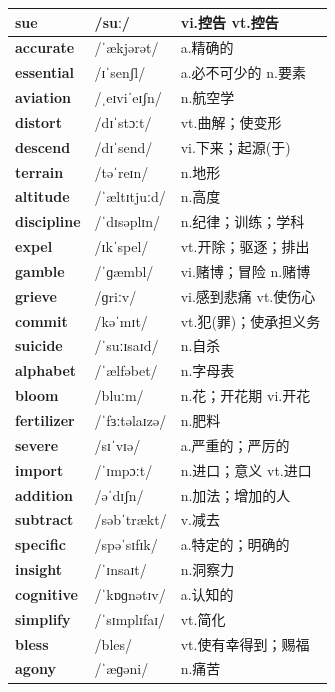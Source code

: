 \documentclass[14pt,a4paper]{extarticle}
\begin{document}
\begin{longtable}{ p{} p{} p{} }
\textbf{sue} & /suː/ & vi.控告 \quad vt.控告 \\ \hline
\textbf{accurate} & /ˈækjərət/ & a.精确的 \\ \hline
\textbf{essential} & /ɪˈsenʃl/ & a.必不可少的 \quad n.要素 \\ \hline
\textbf{aviation} & /ˌeɪviˈeɪʃn/ & n.航空学 \\ \hline
\textbf{distort} & /dɪˈstɔːt/ & vt.曲解；使变形 \\ \hline
\textbf{descend} & /dɪˈsend/ & vi.下来；起源(于) \\ \hline
\textbf{terrain} & /təˈreɪn/ & n.地形 \\ \hline
\textbf{altitude} & /ˈæltɪtjuːd/ & n.高度 \\ \hline
\textbf{discipline} & /ˈdɪsəplɪn/ & n.纪律；训练；学科 \\ \hline
\textbf{expel} & /ɪkˈspel/ & vt.开除；驱逐；排出 \\ \hline
\textbf{gamble} & /ˈɡæmbl/ & vi.赌博；冒险 \quad n.赌博 \\ \hline
\textbf{grieve} & /ɡriːv/ & vi.感到悲痛 \quad vt.使伤心 \\ \hline
\textbf{commit} & /kəˈmɪt/ & vt.犯(罪)；使承担义务 \\ \hline
\textbf{suicide} & /ˈsuːɪsaɪd/ & n.自杀 \\ \hline
\textbf{alphabet} & /ˈælfəbet/ & n.字母表 \\ \hline
\textbf{bloom} & /bluːm/ & n.花；开花期 \quad vi.开花 \\ \hline
\textbf{fertilizer} & /ˈfɜːtəlaɪzə/ & n.肥料 \\ \hline
\textbf{severe} & /sɪˈvɪə/ & a.严重的；严厉的 \\ \hline
\textbf{import} & /ˈɪmpɔːt/ & n.进口；意义 \quad vt.进口 \\ \hline
\textbf{addition} & /əˈdɪʃn/ & n.加法；增加的人 \\ \hline
\textbf{subtract} & /səbˈtrækt/ & v.减去 \\ \hline
\textbf{specific} & /spəˈsɪfɪk/ & a.特定的；明确的 \\ \hline
\textbf{insight} & /ˈɪnsaɪt/ & n.洞察力 \\ \hline
\textbf{cognitive} & /ˈkɒɡnətɪv/ & a.认知的 \\ \hline
\textbf{simplify} & /ˈsɪmplɪfaɪ/ & vt.简化 \\ \hline
\textbf{bless} & /bles/ & vt.使有幸得到；赐福 \\ \hline
\textbf{agony} & /ˈæɡəni/ & n.痛苦 \\ \hline

\end{longtable}
\end{document}
